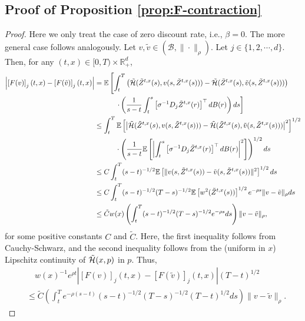 \documentclass[11pt]{article}
\theoremstyle{definition}
\theoremstyle{plain}
\newcommand{\cH}{{\cal H}}
\begin{document}
\begin{appendices}
\subsection{Proof of Proposition \ref{prop:F-contraction}}
\begin{proof}
Here we only treat the case of zero discount rate, i.e., \( \beta = 0 \). The more general case follows analogously.
Let \( v, \tilde{v} \in (\mathcal{B}, \|\cdot\|_\rho) \). Let $j \in \{1, 2, \cdots, d\}$.
Then, for any \( (t,x) \in [0,T) \times \mathbb{R}_+^d \),
\begin{align*}
\left|\left[F(v)\right]_j(t,x) - \left[F(\tilde{v})\right]_j(t,x)\right|
&= \mathbb{E} \left[ \int_t^T \left( \tilde \cH(\tilde{Z}^{t,x}(s), v(s, \tilde{Z}^{t,x}(s))) 
- \tilde \cH(\tilde{Z}^{t,x}(s), \tilde{v}(s, \tilde{Z}^{t,x}(s))) \right) \right. \\
& \qquad \quad \left. \cdot \left( \frac{1}{s - t} \int_t^s \left[\sigma^{-1} D_j \tilde{Z}^{t,x}(r)\right]^{\top} dB(r) \right) ds \right] \\
&\leq \int_t^T \mathbb{E} \left[ \left| \tilde \cH(\tilde{Z}^{t,x}(s), v(s, \tilde{Z}^{t,x}(s))) 
- \tilde \cH(\tilde{Z}^{t,x}(s), \tilde{v}(s, \tilde{Z}^{t,x}(s))) \right|^2 \right]^{1/2} \\
&\qquad \quad \cdot \left( \frac{1}{s - t} \mathbb{E} \left[ \left| \int_t^s \left[\sigma^{-1} D_j \tilde{Z}^{t,x}(r)\right]^{\top} dB(r) \right|^2 \right] \right)^{1/2} ds \\
&\leq C \int_t^T (s - t)^{-1/2} \mathbb{E} \left[ \|v(s, \tilde{Z}^{t,x}(s)) - \tilde{v}(s, \tilde{Z}^{t,x}(s))\|^2 \right]^{1/2} ds \\
&\leq C \int_t^T (s - t)^{-1/2} (T - s)^{-1/2} \mathbb{E} \left[ w^2(\tilde{Z}^{t,x}(s)) \right]^{1/2} 
e^{-\rho s} \| v - \tilde{v} \|_\rho ds \\
&\leq \tilde C w(x) \left( \int_t^T (s - t)^{-1/2} (T - s)^{-1/2} e^{-\rho s} ds \right) 
\| v - \tilde{v} \|_\rho,
\end{align*}
for some positive constants $C$ and $\tilde C$. 
Here, the first inequality follows from Cauchy-Schwarz, 
and the second inequality follows from the (uniform in $x$) Lipschitz continuity of $\tilde \cH(x, p)$ in $p$.
Thus, 
\begin{align*}
& \quad w(x)^{-1}e^{\rho t}  \left|\left[F(v)\right]_j(t,x) - \left[F(\tilde{v})\right]_j(t,x)\right| (T - t)^{1/2} \\
&\leq \tilde C \left( \int_t^T e^{-\rho(s - t)} (s - t)^{-1/2} (T - s)^{-1/2} (T - t)^{1/2} ds \right) 
\| v - \tilde{v} \|_\rho.

\end{align*}
\end{proof}
\end{appendices}
\end{document}
